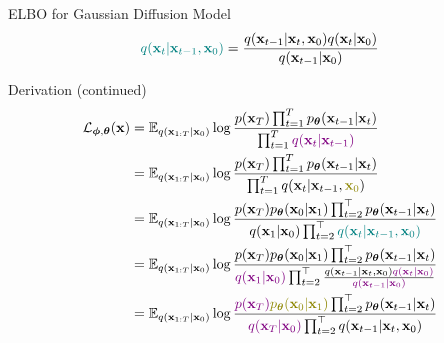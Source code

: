 \documentclass{beamer}
\renewcommand{\eqpause}{}
\renewcommand{\nextonslide}[1]{#1}
\begin{document}
\begin{frame}{ELBO for Gaussian Diffusion Model}
    \[
         {\color{teal}q(\mathbf{x}_t | \mathbf{x}_{t-1}, \mathbf{x}_0)}  = \frac{q(\mathbf{x}_{t-1}|\mathbf{x}_t, \mathbf{x}_0)q(\mathbf{x}_{t} | \mathbf{x}_0)}{q(\mathbf{x}_{t-1}| \mathbf{x}_0)}
    \]
    \eqpause
    \vspace{-0.3cm}
    \begin{block}{Derivation (continued)}
        \vspace{-0.6cm}
        {\small
        \begin{align*}
            \cL_{\bphi, \btheta}(\bx) & = \bbE_{q(\bx_{1:T} | \bx_0)} \log \frac{p(\bx_T) \prod_{t=1}^T \pt(\bx_{t-1} | \bx_t) }{\prod_{t=1}^T {\color{violet}q(\bx_t | \bx_{t-1})}}  \\ 
            \nextonslide{& = \bbE_{q(\bx_{1:T} | \bx_0)} \log \frac{p(\bx_T) \prod_{t=1}^T \pt(\bx_{t-1} | \bx_t) }{\prod_{t=1}^T q(\bx_t | \bx_{t-1}, {\color{olive}\bx_0})}  }\\ 
            \nextonslide{& = \bbE_{q(\bx_{1:T} | \bx_0)} \log \frac{p(\bx_T) \pt(\bx_0 | \bx_1) \prod_{t=2}^\top \pt(\bx_{t-1} | \bx_t) }{q(\bx_1 | \bx_0)\prod_{t=2}^\top {\color{teal}q(\bx_t | \bx_{t-1}, \bx_0)}} }\\
            \nextonslide{& = \bbE_{q(\bx_{1:T} | \bx_0)} \log \frac{p(\bx_T) \pt(\bx_0 | \bx_1) \prod_{t=2}^\top \pt(\bx_{t-1} | \bx_t) }{{\color{violet}q(\bx_1 | \bx_0)}\prod_{t=2}^\top \frac{q(\bx_{t-1}|\bx_t, \bx_0) {\color{violet}q(\bx_{t} | \bx_0)}}{{\color{violet}q(\bx_{t-1}| \bx_0)}}} }\\
            \nextonslide{& = \bbE_{q(\bx_{1:T} | \bx_0)} \log \frac{{\color{violet}p(\bx_T)} {\color{olive}\pt(\bx_0 | \bx_1)} \prod_{t=2}^\top \pt(\bx_{t-1} | \bx_t) }{{\color{violet}q(\bx_T | \bx_0)}\prod_{t=2}^\top q(\bx_{t-1}|\bx_t, \bx_0)} }
        \end{align*}}
    \end{block}
\end{frame}
\end{document}
